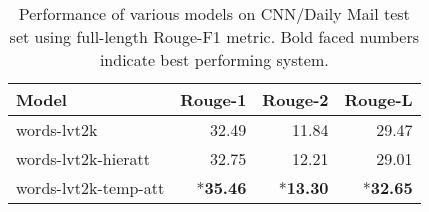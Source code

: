 \begin{table}[]
\centering
{\small
\begin{tabular}{|l|r|r|r|}
\hline
Model & Rouge-1 & Rouge-2 & Rouge-L \\
\hline
words-lvt2k & 32.49 & 11.84 & 29.47 \\
words-lvt2k-hieratt & 32.75 & 12.21 & 29.01 \\
words-lvt2k-temp-att & *{\bf 35.46} & *{\bf 13.30} & *{\bf 32.65} \\
\hline
\end{tabular}
}
\caption{{\small Performance of various models on CNN/Daily Mail test set using full-length Rouge-F1 metric. Bold faced numbers indicate best performing system.}}
\label{tab:cnn}
\vspace{-0.2in}
\end{table}



